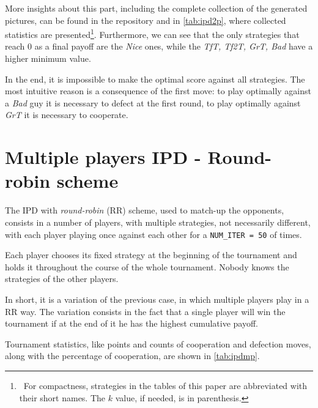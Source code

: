 \documentclass[journal,a4paper,10pt,twoside]{IEEEtran} %
\begin{document}
More insights about this part, including the complete collection of the generated pictures, can be found in the repository and in \autoref{tab:ipd2p}, where collected statistics are presented\footnote{~For compactness, strategies in the tables of this paper are abbreviated with their short names. The $k$ value, if needed, is in parenthesis.}. Furthermore, we can see that the only strategies that reach $0$ as a final payoff are the \textit{Nice} ones, while the \textit{TfT, Tf2T, GrT, Bad} have a higher minimum value.

In the end, it is impossible to make the optimal score against all strategies. The most intuitive reason is a consequence of the first move: to play optimally against a \textit{Bad} guy it is necessary to defect at the first round, to play optimally against \textit{GrT} it is necessary to cooperate.~\cite{mathieu2017}

\section{Multiple players IPD - Round-robin scheme} \label{s:IPDMP}
The IPD with \textit{round-robin} (RR) scheme, used to match-up the opponents, consists in a number of players, with multiple strategies, not necessarily different, with each player playing once against each other for a \texttt{NUM\_ITER = 50} of times.

Each player chooses its fixed strategy at the beginning of the tournament and holds it throughout the course of the whole tournament. Nobody knows the strategies of the other players.

In short, it is a variation of the previous case, in which multiple players play in a RR way. The variation consists in the fact that a single player will win the tournament if at the end of it he has the highest cumulative payoff.

Tournament statistics, like points and counts of cooperation and defection moves, along with the percentage of cooperation, are shown in \autoref{tab:ipdmp}.
\end{document}
